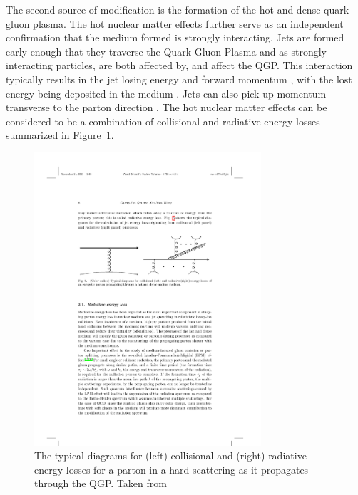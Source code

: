 The second source of modification is the formation of the hot and dense quark gluon plasma.
The hot nuclear matter effects further serve as an independent confirmation that the medium formed is strongly interacting.
Jets are formed early enough that they traverse the Quark Gluon Plasma and as strongly interacting particles, are both affected by, and affect the QGP.
This interaction typically results in the jet losing energy and forward momentum \cite{2012176, ATLAS:2017wvp}, with the lost energy being deposited in the medium \cite{Khachatryan2016}.
Jets can also pick up momentum transverse to the parton direction \cite{Chatrchyan:2012nia}.
The hot nuclear matter effects can be considered to be a combination of collisional and radiative energy losses summarized in Figure~\ref{fig:jetEnergyLoss}.

\begin{figure}[htbp]
\begin{center}
\includegraphics[width=0.75\textwidth]{figures/theory/jetEnergyLoss}
\caption{The typical diagrams for (left) collisional and (right) radiative energy losses for a parton in a hard scattering as it propagates through the QGP.
Taken from \cite{Qin:2015srf}}
\label{fig:jetEnergyLoss}
\end{center}
\end{figure}


